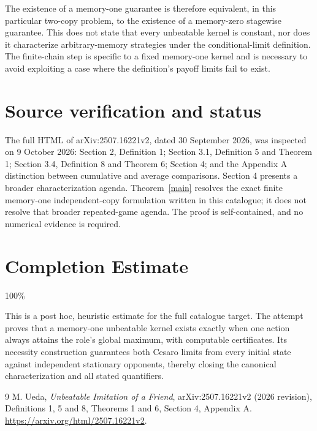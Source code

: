 \documentclass[11pt]{article}
\theoremstyle{remark}
\begin{document}
The existence of a memory-one guarantee is therefore equivalent, in this particular two-copy problem, to the existence of a memory-zero stagewise guarantee. This does not state that every unbeatable kernel is constant, nor does it characterize arbitrary-memory strategies under the conditional-limit definition. The finite-chain step is specific to a fixed memory-one kernel and is necessary to avoid exploiting a case where the definition's payoff limits fail to exist.

\section{Source verification and status}
The full HTML of arXiv:2507.16221v2, dated 30 September 2026, was inspected on 9 October 2026: Section 2, Definition 1; Section 3.1, Definition 5 and Theorem 1; Section 3.4, Definition 8 and Theorem 6; Section 4; and the Appendix A distinction between cumulative and average comparisons. Section 4 presents a broader characterization agenda. Theorem~\ref{main} resolves the exact finite memory-one independent-copy formulation written in this catalogue; it does not resolve that broader repeated-game agenda. The proof is self-contained, and no numerical evidence is required.

\section{Completion Estimate}
100\%

This is a post hoc, heuristic estimate for the full catalogue target.
The attempt proves that a memory-one unbeatable kernel exists exactly when one action always attains the role's global maximum, with computable certificates. Its necessity construction guarantees both Cesaro limits from every initial state against independent stationary opponents, thereby closing the canonical characterization and all stated quantifiers.

\begin{thebibliography}{9}
 M. Ueda, \emph{Unbeatable Imitation of a Friend}, arXiv:2507.16221v2 (2026 revision), Definitions 1, 5 and 8, Theorems 1 and 6, Section 4, Appendix A. \url{https://arxiv.org/html/2507.16221v2}.
\end{thebibliography}
\end{document}
